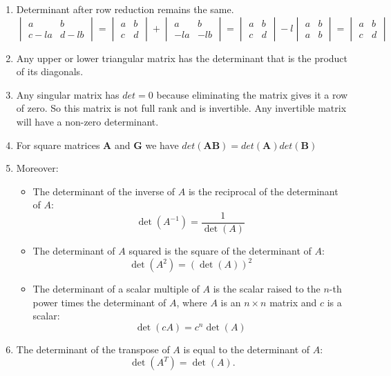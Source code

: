 \begin{enumerate}
    \item Determinant after row reduction remains the same. \[
\begin{vmatrix}
a & b \\
c - la & d - lb
\end{vmatrix}
=
\begin{vmatrix}
a & b \\
c & d
\end{vmatrix}
+
\begin{vmatrix}
a & b \\
-la & -lb
\end{vmatrix}
=
\begin{vmatrix}
a & b \\
c & d
\end{vmatrix}
-
l
\begin{vmatrix}
a & b \\
a & b
\end{vmatrix}
=
\begin{vmatrix}
a & b \\
c & d
\end{vmatrix}
\]

\item Any upper or lower triangular matrix has the determinant that is the product of its diagonals.
\item Any singular matrix has $det = 0$ because eliminating the matrix gives it a row of zero. So this matrix is not full rank and is invertible. Any invertible matrix will have a non-zero determinant.
\item For square matrices $\textbf{A}$ and $\textbf{G}$ we have $det(\textbf{AB}) = det(\textbf{A})det(\textbf{B})$
    \item Moreover:
    \begin{itemize}
        \item The determinant of the inverse of \( A \) is the reciprocal of the determinant of \( A \):
        \[
        \det(A^{-1}) = \frac{1}{\det(A)}
        \]

        \item The determinant of \( A \) squared is the square of the determinant of \( A \):
        \[
        \det(A^2) = (\det(A))^2
        \]

        \item The determinant of a scalar multiple of \( A \) is the scalar raised to the \( n \)-th power times the determinant of \( A \), where \( A \) is an \( n \times n \) matrix and \( c \) is a scalar:
        \[
        \det(cA) = c^n\det(A)
        \]

    \end{itemize}

    \item The determinant of the transpose of \( A \) is equal to the determinant of \( A \):
    \[
    \det(A^T) = \det(A).
    \]
\end{enumerate}



